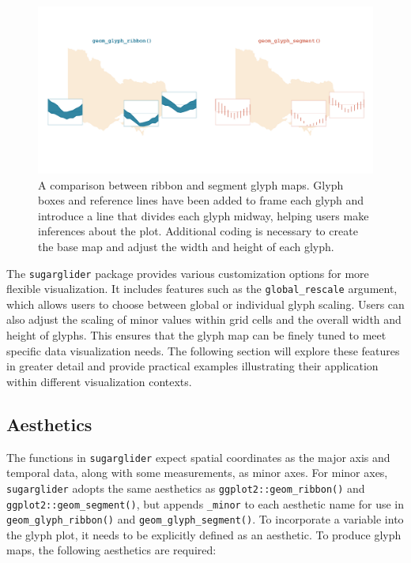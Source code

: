 \begin{figure}

{\centering \includegraphics[width=1\linewidth]{figures/ribbon_segment} 

}

\caption{A comparison between ribbon and segment glyph maps. Glyph boxes and reference lines have been added to frame each glyph and introduce a line that divides each glyph midway, helping users make inferences about the plot. Additional coding is necessary to create the base map and adjust the width and height of each glyph.}\label{fig:comparisonPlot}
\end{figure}

The \texttt{sugarglider} package provides various customization options for more flexible visualization. It includes features such as the \texttt{global\_rescale} argument, which allows users to choose between global or individual glyph scaling. Users can also adjust the scaling of minor values within grid cells and the overall width and height of glyphs. This ensures that the glyph map can be finely tuned to meet specific data visualization needs. The following section will explore these features in greater detail and provide practical examples illustrating their application within different visualization contexts.

\hypertarget{aesthetics}{%
\subsection{Aesthetics}\label{aesthetics}}

The functions in \texttt{sugarglider} expect spatial coordinates as the major axis and temporal data, along with some measurements, as minor axes. For minor axes, \texttt{sugarglider} adopts the same aesthetics as \texttt{ggplot2::geom\_ribbon()} and \texttt{ggplot2::geom\_segment()}, but appends \texttt{\_minor} to each aesthetic name for use in \texttt{geom\_glyph\_ribbon()} and \texttt{geom\_glyph\_segment()}. To incorporate a variable into the glyph plot, it needs to be explicitly defined as an aesthetic. To produce glyph maps, the following aesthetics are required:

